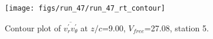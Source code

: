 \begin{figure}[H]
\centering
\texttt{[image: figs/run\_47/run\_47\_rt\_contour]}
\caption{Contour plot of $\overline{v_{r}^{\prime} v_{\theta}^{\prime}}$ at $z/c$=9.00, $V_{free}$=27.08, station 5.}
\label{fig:run_47_rt_contour}
\end{figure}


